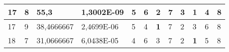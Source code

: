 \documentclass[conference]{IEEEtran}
\begin{document}
\begin{table*}[]
\begin{tabular}{|llll|llllllll|}
\multicolumn{1}{|l|}{17}                                                    & \multicolumn{1}{l|}{8}                                                        & \multicolumn{1}{l|}{55,3}                                                         & 1,3002E-09                     & \multicolumn{1}{l|}{5}                                                  & \multicolumn{1}{l|}{6}                                                  & \multicolumn{1}{l|}{2}                                                  & \multicolumn{1}{l|}{7}                                                  & \multicolumn{1}{l|}{3}                                                  & \multicolumn{1}{l|}{\textbf{1}}                                         & \multicolumn{1}{l|}{4}                                                  & 8                          \\ \hline
\multicolumn{1}{|l|}{17}                                                    & \multicolumn{1}{l|}{9}                                                        & \multicolumn{1}{l|}{38,4666667}                                                   & 2,4699E-06                     & \multicolumn{1}{l|}{5}                                                  & \multicolumn{1}{l|}{4}                                                  & \multicolumn{1}{l|}{\textbf{1}}                                         & \multicolumn{1}{l|}{7}                                                  & \multicolumn{1}{l|}{2}                                                  & \multicolumn{1}{l|}{3}                                                  & \multicolumn{1}{l|}{6}                                                  & 8                          \\ \hline
\multicolumn{1}{|l|}{18}                                                    & \multicolumn{1}{l|}{7}                                                        & \multicolumn{1}{l|}{31,0666667}                                                   & 6,0438E-05                     & \multicolumn{1}{l|}{4}                                                  & \multicolumn{1}{l|}{6}                                                  & \multicolumn{1}{l|}{3}                                                  & \multicolumn{1}{l|}{7}                                                  & \multicolumn{1}{l|}{2}                                                  & \multicolumn{1}{l|}{\textbf{1}}                                         & \multicolumn{1}{l|}{5}                                                  & 8                          \\ \hline

\end{tabular}
\end{table*}
\end{document}
